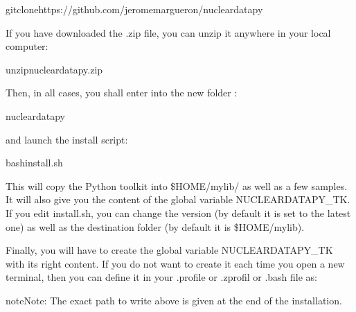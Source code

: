 \documentclass[letterpaper,10pt,english]{sphinxmanual}
\begin{document}
\begin{sphinxVerbatim}[commandchars=\\\{\}]
gitclonehttps://github.com/jeromemargueron/nucleardatapy
\end{sphinxVerbatim}

\sphinxAtStartPar
If you have downloaded the .zip file, you can unzip it anywhere in your local computer:

\begin{sphinxVerbatim}[commandchars=\\\{\}]
unzipnucleardatapy.zip
\end{sphinxVerbatim}

\sphinxAtStartPar
Then, in all cases, you shall enter into the new folder :

\begin{sphinxVerbatim}[commandchars=\\\{\}]
nucleardatapy
\end{sphinxVerbatim}

\sphinxAtStartPar
and launch the install script:

\begin{sphinxVerbatim}[commandchars=\\\{\}]
bashinstall.sh
\end{sphinxVerbatim}

\sphinxAtStartPar
This will copy the Python toolkit into \$HOME/mylib/ as well as a few samples. It will also give you the content of the global variable NUCLEARDATAPY\_TK. If you edit install.sh, you can change the version (by default it is set to the latest one) as well as the destination folder (by default it is \$HOME/mylib).

\sphinxAtStartPar
Finally, you will have to create the global variable NUCLEARDATAPY\_TK with its right content. If you do not want to create it each time you open a new terminal, then you can define it in your .profile or .zprofil or .bash file as:

\begin{sphinxVerbatim}[commandchars=\\\{\}]
\end{sphinxVerbatim}

\begin{sphinxadmonition}{note}{Note:}
\sphinxAtStartPar
The exact path to write above is given at the end of the installation.
\end{sphinxadmonition}
\end{document}
